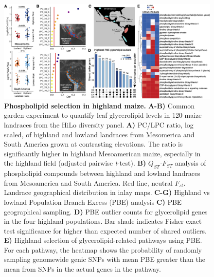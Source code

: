 \documentclass[9pt,twocolumn,twoside,lineno]{biorxiv}
\begin{document}
\begin{figure}[htp]
\begin{center}
\includegraphics[width=0.8\paperwidth]{Figures/Fig_1.png}
\caption{\textbf{Phospholipid selection in highland maize.} 
\textbf{A-B)} Common garden experiment to quantify leaf glycerolipid levels in 120 maize landraces from the HiLo diversity panel. 
\textbf{A)} PC/LPC ratio, log scaled, of highland and lowland landraces from Mesomerica and South America grown at contrasting elevations. The ratio is significantly higher in highland Mesoamerican maize, especially in the highland field (adjusted pairwise \textit{t}-test). 
\textbf{B)} \textit{$Q_{ST}$-$F_{ST}$} analysis of phospholipid compounds between highland and lowland landraces from Mesoamerica and South America. Red line, neutral $F_{st}$.
Landrace geographical distribution in inlay maps.
\textbf{C-G)} Highland vs lowland Population Branch Excess (PBE) analysis
\textbf{C)} PBE geographical sampling.
\textbf{D)} PBE outlier counts for glycerolipid genes in the four highland populations.
Bar shade indicates Fisher exact test significance for higher than expected number of shared outliers. 
\textbf{E)} Highland selection of glycerolipid-related pathways using PBE.  
For each pathway, the heatmap shows the probability of randomly sampling genomewide genic SNPs with mean PBE greater than the mean from SNPs in the actual genes in the pathway.}
\label{Fig1}
\end{center}
\end{figure}
\end{document}
